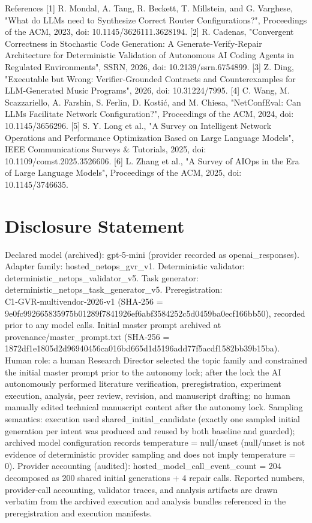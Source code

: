 \documentclass[conference]{IEEEtran}
\begin{document}
References
[1] R. Mondal, A. Tang, R. Beckett, T. Millstein, and G. Varghese, "What do LLMs need to Synthesize Correct Router Configurations?", Proceedings of the ACM, 2023, doi: 10.1145/3626111.3628194.
[2] R. Cadenas, "Convergent Correctness in Stochastic Code Generation: A Generate‑Verify‑Repair Architecture for Deterministic Validation of Autonomous AI Coding Agents in Regulated Environments", SSRN, 2026, doi: 10.2139/ssrn.6754899.
[3] Z. Ding, "Executable but Wrong: Verifier‑Grounded Contracts and Counterexamples for LLM‑Generated Music Programs", 2026, doi: 10.31224/7995.
[4] C. Wang, M. Scazzariello, A. Farshin, S. Ferlin, D. Kostić, and M. Chiesa, "NetConfEval: Can LLMs Facilitate Network Configuration?", Proceedings of the ACM, 2024, doi: 10.1145/3656296.
[5] S. Y. Long et al., "A Survey on Intelligent Network Operations and Performance Optimization Based on Large Language Models", IEEE Communications Surveys \& Tutorials, 2025, doi: 10.1109/comst.2025.3526606.
[6] L. Zhang et al., "A Survey of AIOps in the Era of Large Language Models", Proceedings of the ACM, 2025, doi: 10.1145/3746635.

\section*{Disclosure Statement}
Declared model (archived): gpt‑5‑mini (provider recorded as openai\_responses). Adapter family: hosted\_netops\_gvr\_v1. Deterministic validator: deterministic\_netops\_validator\_v5. Task generator: deterministic\_netops\_task\_generator\_v5. Preregistration: C1‑GVR‑multivendor‑2026‑v1 (SHA‑256 = 9e0fc992\allowbreak{}66583597\allowbreak{}5b01289f\allowbreak{}7841926e\allowbreak{}f6abf358\allowbreak{}4252c5d0\allowbreak{}459ba0ec\allowbreak{}f166bb50), recorded prior to any model calls. Initial master prompt archived at provenance/master\_prompt.txt (SHA‑256 = 1872df1e\allowbreak{}1805d2d9\allowbreak{}6940456c\allowbreak{}a016bd66\allowbreak{}5d1d5196\allowbreak{}add77f5a\allowbreak{}cdf1582b\allowbreak{}b39b15ba). Human role: a human Research Director selected the topic family and constrained the initial master prompt prior to the autonomy lock; after the lock the AI autonomously performed literature verification, preregistration, experiment execution, analysis, peer review, revision, and manuscript drafting; no human manually edited technical manuscript content after the autonomy lock. Sampling semantics: execution used shared\_initial\_candidate (exactly one sampled initial generation per intent was produced and reused by both baseline and guarded); archived model configuration records temperature = null/unset (null/unset is not evidence of deterministic provider sampling and does not imply temperature = 0). Provider accounting (audited): hosted\_model\_call\_event\_count = 204 decomposed as 200 shared initial generations + 4 repair calls. Reported numbers, provider‑call accounting, validator traces, and analysis artifacts are drawn verbatim from the archived execution and analysis bundles referenced in the preregistration and execution manifests.
\end{document}
